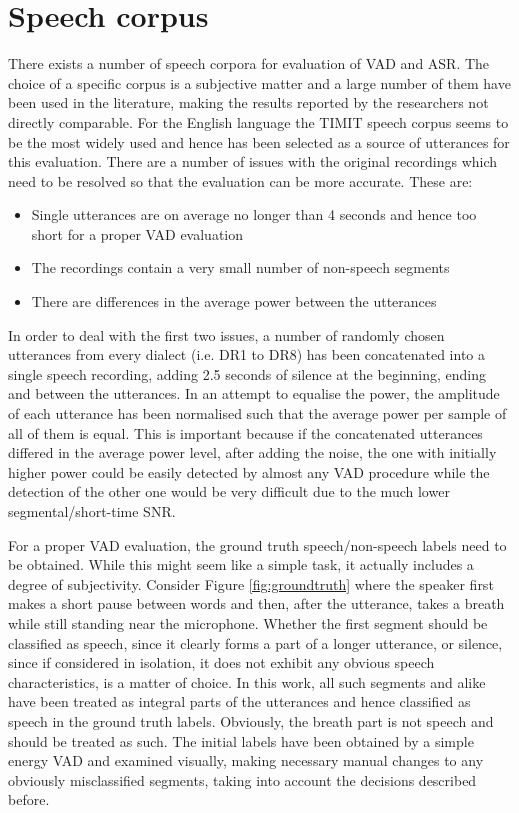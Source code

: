 
\section{Speech corpus}

There exists a number of speech corpora for evaluation of VAD and ASR. The choice of a specific corpus is a subjective matter and a large number of them have been used in the literature, making the results reported by the researchers not directly comparable. For the English language the TIMIT speech corpus \cite{TIMIT} seems to be the most widely used and hence has been selected as a source of utterances for this evaluation. There are a number of issues with the original recordings which need to be resolved so that the evaluation can be more accurate. These are:

\begin{itemize}
\item Single utterances are on average no longer than 4 seconds and hence too short for a proper VAD evaluation
\item The recordings contain a very small number of non-speech segments
\item There are differences in the average power between the utterances
\end{itemize}

In order to deal with the first two issues, a number of randomly chosen utterances from every dialect (i.e. DR1 to DR8) has been concatenated into a single speech recording, adding 2.5 seconds of silence at the beginning, ending and between the utterances. In an attempt to equalise the power, the amplitude of each utterance has been normalised such that the average power per sample of all of them is equal. This is important because if the concatenated utterances differed in the average power level, after adding the noise, the one with initially higher power could be easily detected by almost any VAD procedure while the detection of the other one would be very difficult due to the much lower segmental/short-time SNR.

For a proper VAD evaluation, the ground truth speech/non-speech labels need to be obtained. While this might seem like a simple task, it actually includes a degree of subjectivity. Consider Figure \ref{fig:groundtruth} where the speaker first makes a short pause between words and then, after the utterance, takes a breath while still standing near the microphone. Whether the first segment should be classified as speech, since it clearly forms a part of a longer utterance, or silence, since if considered in isolation, it does not exhibit any obvious speech characteristics, is a matter of choice. In this work, all such segments and alike have been treated as integral parts of the utterances and hence classified as speech in the ground truth labels. Obviously, the breath part is not speech and should be treated as such. The initial labels have been obtained by a simple energy VAD and examined visually, making necessary manual changes to any obviously misclassified segments, taking into account the decisions described before.

